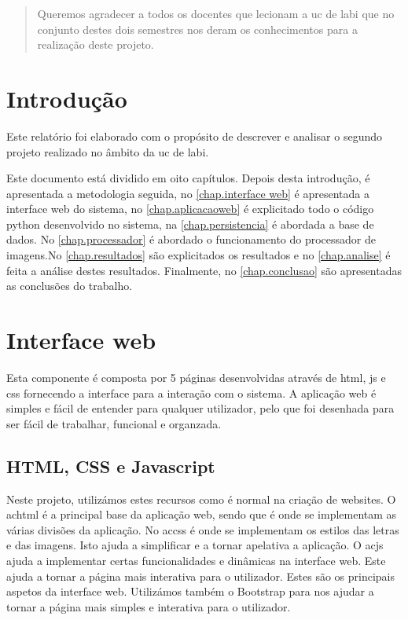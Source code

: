 \documentclass{report}
\begin{document}
\renewcommand{\abstractname}{Agradecimentos}
\begin{abstract}
Queremos agradecer a todos os docentes que lecionam a  \ac{uc} de \ac{labi} que no conjunto destes dois semestres nos deram os conhecimentos para a realização deste projeto.
\end{abstract}


\tableofcontents
\listoffigures    


\clearpage
{}

\chapter{Introdução}
\label{chap.introducao}

Este relatório foi elaborado com o propósito de descrever e analisar o segundo projeto realizado no âmbito da \ac{uc} de \ac{labi}.

Este documento está dividido em oito capítulos.
Depois desta introdução,
 é apresentada a metodologia seguida,
no \autoref{chap.interface web} é apresentada a interface web do sistema, no \autoref{chap.aplicacaoweb} é explicitado todo o código python desenvolvido no sistema, na \autoref{chap.persistencia} é abordada a base de dados. No \autoref{chap.processador} é abordado o funcionamento do processador de imagens.No \autoref{chap.resultados} são explicitados os resultados e no \autoref{chap.analise} é feita a análise destes resultados.
Finalmente, no \autoref{chap.conclusao} são apresentadas
as conclusões do trabalho.

\chapter{Interface web}
\label{chap.interface web}
Esta componente é composta por 5 páginas desenvolvidas através de  \ac{html}, \ac{js} e \ac{css} fornecendo a interface para a interação com o sistema. A aplicação web é simples e fácil de entender para qualquer utilizador, pelo que foi desenhada para ser fácil de trabalhar, funcional e organzada.

\section{HTML, CSS e Javascript}
Neste projeto, utilizámos estes recursos como é normal na criação de websites. O ac{html} é a principal base da aplicação web, sendo que é onde se implementam as várias divisões da aplicação. No ac{css} é onde se implementam os estilos das letras e das imagens. Isto ajuda a simplificar e a tornar apelativa a aplicação. O ac{js} ajuda a implementar certas funcionalidades e dinâmicas na interface web. Este ajuda a tornar a página mais interativa para o utilizador. Estes são os principais aspetos da interface web. Utilizámos também o Bootstrap para nos ajudar a tornar a página mais simples e interativa para o utilizador.
\end{document}
